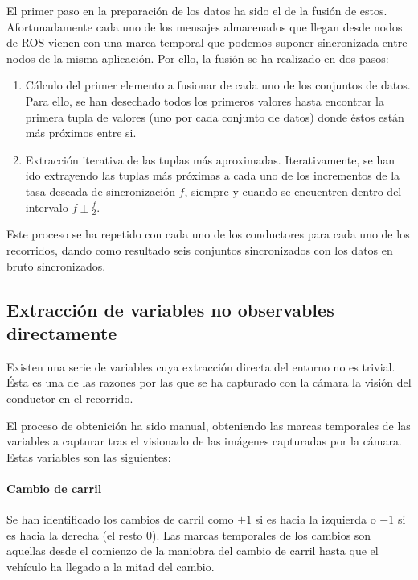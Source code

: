 El primer paso en la preparación de los datos ha sido el de la fusión de estos. Afortunadamente cada uno de los mensajes almacenados que llegan desde nodos de ROS vienen con una marca temporal que podemos suponer sincronizada entre nodos de la misma aplicación. Por ello, la fusión se ha realizado en dos pasos:

\begin{enumerate}
	\item Cálculo del primer elemento a fusionar de cada uno de los conjuntos de datos. Para ello, se han desechado todos los primeros valores hasta encontrar la primera tupla de valores (uno por cada conjunto de datos) donde éstos están más próximos entre si.
	\item Extracción iterativa de las tuplas más aproximadas. Iterativamente, se han ido extrayendo las tuplas más próximas a cada uno de los incrementos de la tasa deseada de sincronización $f$, siempre y cuando se encuentren dentro del intervalo $f \pm \frac{f}{2}$.
\end{enumerate}

Este proceso se ha repetido con cada uno de los conductores para cada uno de los recorridos, dando como resultado seis conjuntos sincronizados con los datos en bruto sincronizados.

\subsection{Extracción de variables no observables directamente}

Existen una serie de variables cuya extracción directa del entorno no es trivial. Ésta es una de las razones por las que se ha capturado con la cámara la visión del conductor en el recorrido.

El proceso de obtenición ha sido manual, obteniendo las marcas temporales de las variables a capturar tras el visionado de las imágenes capturadas por la cámara. Estas variables son las siguientes:

\paragraph{Cambio de carril}

Se han identificado los cambios de carril como $+1$ si es hacia la izquierda o $-1$ si es hacia la derecha (el resto $0$). Las marcas temporales de los cambios son aquellas desde el comienzo de la maniobra del cambio de carril hasta que el vehículo ha llegado a la mitad del cambio.

